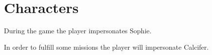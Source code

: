 \chapter{Characters}

During the game the player impersonates Sophie.

In order to fulfill some missions the player will impersonate Calcifer.


%

















